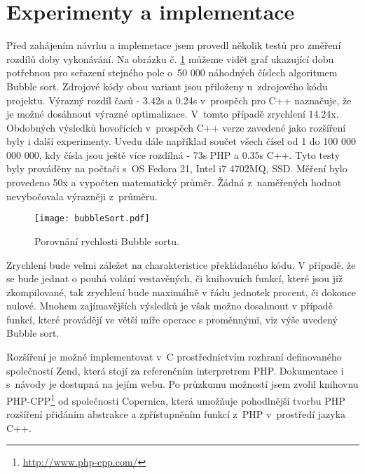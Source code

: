 \documentclass[czech]{ExcelAtFIT}
\begin{document}
\section{Experimenty a implementace}

	Před zahájením návrhu a implemetace jsem provedl několik testů pro změření rozdílů doby vykonávání. Na obrázku č. \ref{fig:bubbleSort} můžeme vidět graf ukazující dobu potřebnou pro seřazení stejného pole o~50 000 ná\-hod\-ných číslech algoritmem Bubble sort. Zdrojové kódy obou variant jsou přiloženy u~zdrojového kódu projektu. Výrazný rozdíl časů - 3.42s a 0.24s v~prospěch pro C++ naznačuje, že je možné dosáhnout výrazné optimalizace. V~tomto případě zrychlení 14.24x. Obdobných výsledků hovořících v~prospěch C++ verze zavedené jako rozšíření byly i další experimenty. Uvedu dále například součet všech čísel od 1 do 100 000 000 000, kdy čísla jsou ještě více rozdílná - 73s PHP a 0.35s C++. Tyto testy byly prováděny na počtači s~OS Fedora 21, Intel i7 4702MQ, SSD. Měření bylo provedeno 50x a vypočten matematický průměr. Žádná z~naměřených hodnot nevybočovala výrazněji z~prů\-mě\-ru.


\begin{figure}[t]
	\centering
	\texttt{[image: bubbleSort.pdf]}
	\caption{Porovnání rychlosti Bubble sortu.}
	\label{fig:bubbleSort}
\end{figure}

	Zrychlení bude velmi záležet na charakteristice překládaného kódu. V případě, že se bude jednat o pouhá volání vestavěných, či knihovních funkcí, které jsou již zkompilované, tak zrychlení bude maximálně v řádu jednotek procent, či dokonce nulové. Mnohem zajímavějších výsledků je však možno dosahnout v případě funkcí, které provádějí ve větší míře operace s proměnnými, viz výše uvedený Bubble sort.

	Rozšíření je možné implementovat v~C pro\-střed\-nic\-tvím rozhraní definovaného společností Zend, která stojí za referenčním interpretrem PHP. Dokumentace i s~návody je dostupná na jejím webu. Po průzkumu možností jsem zvolil knihovnu PHP-CPP\footnote{\url{http://www.php-cpp.com/}} od spo\-leč\-nos\-ti Copernica, která umožňuje pohodlnější tvorbu PHP rozšíření přidáním abstrakce a zpřístupněním funkcí z~PHP v~prostředí jazyka C++.
\end{document}
